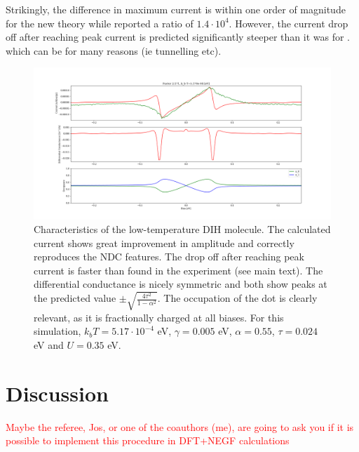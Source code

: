 \documentclass{article}
\begin{document}
\begin{multicols}{2}
        Strikingly, the difference in maximum current is within one order of magnitude for the new theory while \citet{perrinnano} reported a ratio of $1.4\cdot10^{4}$. However, the current drop off after reaching peak current is predicted significantly steeper than it was for \citet{perrinnano}.  {\color{red} which can be for many reasons (ie tunnelling etc)}.
        
        
        
    \begin{figure}[b]
        \centering
        \includegraphics[width=\textwidth]{figure_gam0050alpha55tau024capacitive35points200.png}
        \caption{\label{fig:perrinmolecule} Characteristics of the low-temperature DIH molecule. The calculated current shows great improvement in amplitude and correctly reproduces the NDC features. The drop off after reaching peak current  is faster than found in the experiment (see main text). The differential conductance is nicely symmetric and both show peaks at the predicted value $\pm\sqrt{\frac{4\tau^2}{1-\alpha^2}}$. The occupation of the dot is clearly relevant, as it is fractionally charged at all biases. For this simulation, $k_b T=5.17\cdot 10^{-4}$ eV, $\gamma=0.005$ eV, $\alpha=0.55$, $\tau=0.024$ eV and $U=0.35$ eV.}
    \end{figure}
    
    \section{Discussion}\label{sec:discussion}
    \textcolor{red}{ Maybe the referee, Jos, or one of the coauthors (me), are going to ask you if it is possible to implement this procedure in DFT+NEGF calculations}
    
    
     
\end{multicols}
\end{document}
